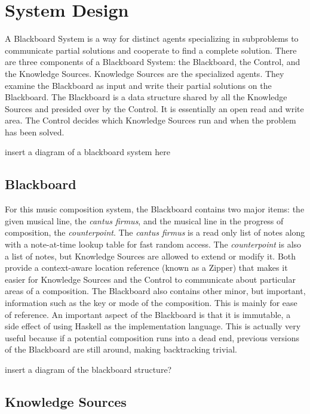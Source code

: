 \section{System Design} %

A Blackboard System is a way for distinct agents specializing in subproblems to communicate partial solutions and cooperate to find a complete solution.
There are three components of a Blackboard System: the Blackboard, the Control, and the Knowledge Sources.
Knowledge Sources are the specialized agents. They examine the Blackboard as input and write their partial solutions on the Blackboard.
The Blackboard is a data structure shared by all the Knowledge Sources and presided over by the Control. It is essentially an open read and write area.
The Control decides which Knowledge Sources run and when the problem has been solved.

insert a diagram of a blackboard system here

\subsection{Blackboard} %

For this music composition system, the Blackboard contains two major items: the given musical line, the \emph{cantus firmus}, and the musical line in the progress of composition, the \emph{counterpoint}.
The \emph{cantus firmus} is a read only list of notes along with a note-at-time lookup table for fast random access.
The \emph{counterpoint} is also a list of notes, but Knowledge Sources are allowed to extend or modify it.
Both provide a context-aware location reference (known as a Zipper) that makes it easier for Knowledge Sources and the Control to communicate about particular areas of a composition.
The Blackboard also contains other minor, but important, information such as the key or mode of the composition. This is mainly for ease of reference.
An important aspect of the Blackboard is that it is immutable, a side effect of using Haskell as the implementation language.
This is actually very useful because if a potential composition runs into a dead end, previous versions of the Blackboard are still around, making backtracking trivial.

insert a diagram of the blackboard structure?

\subsection{Knowledge Sources} %

